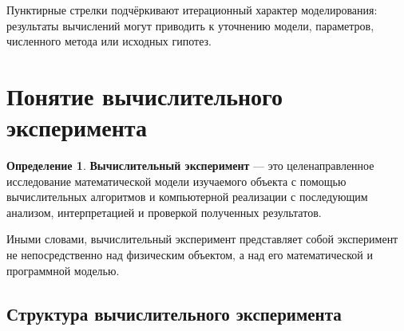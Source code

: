 \documentclass[12pt,a4paper]{article}
\theoremstyle{definition}
\newtheorem{definition}{Определение}
\theoremstyle{plain}
\begin{document}
\begin{center}
\end{center}

Пунктирные стрелки подчёркивают итерационный характер моделирования: результаты вычислений могут приводить к уточнению модели, параметров, численного метода или исходных гипотез.

\section{Понятие вычислительного эксперимента}

\begin{definition}
\textbf{Вычислительный эксперимент} --- это целенаправленное исследование математической модели изучаемого объекта с помощью вычислительных алгоритмов и компьютерной реализации с последующим анализом, интерпретацией и проверкой полученных результатов.
\end{definition}

Иными словами, вычислительный эксперимент представляет собой эксперимент не непосредственно над физическим объектом, а над его математической и программной моделью.

\subsection{Структура вычислительного эксперимента}
\end{document}
